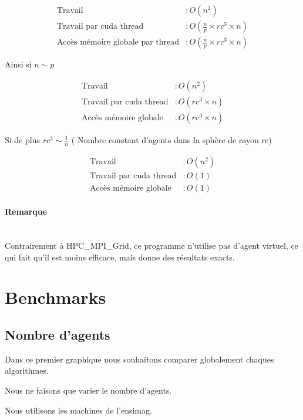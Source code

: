 \documentclass[liens,entete-ensimag,margeCorrection]{ensirapport}
\begin{document}
\begin{align*}
    \text{Travail} &: O\left( n^2 \right) \\
    \text{Travail par cuda thread} &: O\left( \frac n p \times rc^3 \times n \right)  \\
    \text{Accès mémoire globale par thread} &: O\left( \frac n p \times rc^3 \times n \right)
\end{align*}

Ainsi si $n \sim p$

\begin{align*}
    \text{Travail} &: O\left( n^2 \right) \\
    \text{Travail par cuda thread} &: O\left( rc^3 \times n \right)  \\
    \text{Accès mémoire globale} &: O\left( rc^3 \times n \right)
\end{align*}

Si de plus  $ rc^3 \sim \frac 1n$  ( Nombre constant d'agents dans la sphère de rayon rc)

\begin{align*}
    \text{Travail} &: O\left( n^2 \right) \\
    \text{Travail par cuda thread} &: O\left( 1 \right)  \\
    \text{Accès mémoire globale} &: O\left( 1\right)
\end{align*}

\paragraph{Remarque}~ \\
Contrairement à HPC\_MPI\_Grid, ce programme n'utilise pas d'agent virtuel, ce qui fait qu'il est moins efficace, mais donne des résultats exacts.

\section{Benchmarks}

\subsection{Nombre d'agents}

Dans ce premier graphique nous souhaitons comparer globalement chaques algorithmes.

Nous ne faisons que varier le nombre d'agents.

Nous utilisons les machines de l'ensimag.
\end{document}
